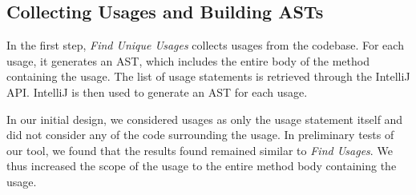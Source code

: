 \documentclass[conference]{IEEEtran}
\begin{document}



\subsection{Collecting Usages and Building ASTs}
In the first step, \textit{Find Unique Usages} collects usages from the codebase. For each usage, it generates an AST, which includes the entire body of the method containing the usage. The list of usage statements is retrieved through the IntelliJ API. IntelliJ is then used to generate an AST for each usage. 
\par
 
In our initial design, we considered usages as only the usage statement itself and did not consider any of the code surrounding the usage. In preliminary tests of our tool, we found that the results found remained similar to \textit{Find Usages}. We thus increased the scope of the usage to the entire method body containing the usage. 
\par
\end{document}
